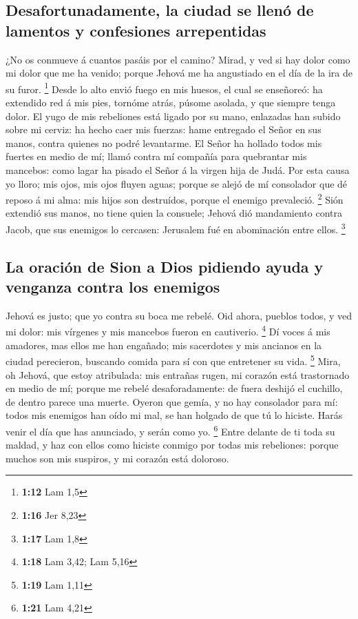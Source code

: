 \hypertarget{desafortunadamente-la-ciudad-se-llenuxf3-de-lamentos-y-confesiones-arrepentidas}{%
\subsection{Desafortunadamente, la ciudad se llenó de lamentos y
confesiones
arrepentidas}\label{desafortunadamente-la-ciudad-se-llenuxf3-de-lamentos-y-confesiones-arrepentidas}}

 ¿No os conmueve á cuantos pasáis por el camino? Mirad, y
ved si hay dolor como mi dolor que me ha venido; porque Jehová me ha
angustiado en el día de la ira de su furor. \footnote{\textbf{1:12} Lam
  1,5}  Desde lo alto envió fuego en mis huesos, el cual
se enseñoreó: ha extendido red á mis pies, tornóme atrás, púsome
asolada, y que siempre tenga dolor.  El yugo de mis
rebeliones está ligado por su mano, enlazadas han subido sobre mi
cerviz: ha hecho caer mis fuerzas: hame entregado el Señor en sus manos,
contra quienes no podré levantarme.  El Señor ha hollado
todos mis fuertes en medio de mí; llamó contra mí compañía para
quebrantar mis mancebos: como lagar ha pisado el Señor á la virgen hija
de Judá.  Por esta causa yo lloro; mis ojos, mis ojos
fluyen aguas; porque se alejó de mí consolador que dé reposo á mi alma:
mis hijos son destruídos, porque el enemigo prevaleció. \footnote{\textbf{1:16}
  Jer 8,23}  Sión extendió sus manos, no tiene quien la
consuele; Jehová dió mandamiento contra Jacob, que sus enemigos lo
cercasen: Jerusalem fué en abominación entre ellos. \footnote{\textbf{1:17}
  Lam 1,8}

\hypertarget{la-oraciuxf3n-de-sion-a-dios-pidiendo-ayuda-y-venganza-contra-los-enemigos}{%
\subsection{La oración de Sion a Dios pidiendo ayuda y venganza contra
los
enemigos}\label{la-oraciuxf3n-de-sion-a-dios-pidiendo-ayuda-y-venganza-contra-los-enemigos}}

 Jehová es justo; que yo contra su boca me rebelé. Oid
ahora, pueblos todos, y ved mi dolor: mis vírgenes y mis mancebos fueron
en cautiverio. \footnote{\textbf{1:18} Lam 3,42; Lam 5,16}
 Dí voces á mis amadores, mas ellos me han engañado; mis
sacerdotes y mis ancianos en la ciudad perecieron, buscando comida para
sí con que entretener su vida. \footnote{\textbf{1:19} Lam 1,11}
 Mira, oh Jehová, que estoy atribulada: mis entrañas
rugen, mi corazón está trastornado en medio de mí; porque me rebelé
desaforadamente: de fuera deshijó el cuchillo, de dentro parece una
muerte.  Oyeron que gemía, y no hay consolador para mí:
todos mis enemigos han oído mi mal, se han holgado de que tú lo hiciste.
Harás venir el día que has anunciado, y serán como yo. \footnote{\textbf{1:21}
  Lam 4,21}  Entre delante de ti toda su maldad, y haz
con ellos como hiciste conmigo por todas mis rebeliones: porque muchos
son mis suspiros, y mi corazón está doloroso.

